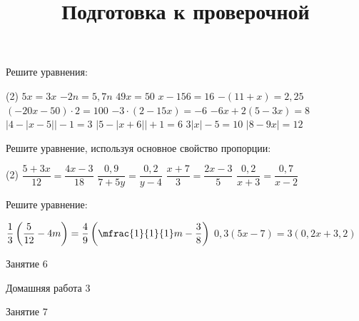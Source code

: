\begin{homework}[number=1]
	\begin{listofex}
		\item Решите уравнения: %
		\begin{tasks}(2)
			\task \( 5x=3x \)
			\task \( -2n=5,7n \)
			\task \( 49x=50 \)
			\task \( x-156=16 \)
			\task \( -(11+x)=2,25 \)
			\task \( (-20x-50)\cdot 2 = 100 \)
			\task \( -3 \cdot (2-15x) = -6 \)
			\task \( -6x+2(5-3x)=8 \)
			\task \( |4-|x-5||-1=3 \)
			\task \( |5-|x+6||+1=6 \)
			\task \( 3|x|-5=10 \)
			\task \( |8-9x|=12 \)
		\end{tasks}
		\item Решите уравнение, используя основное свойство пропорции:
		\begin{tasks}(2)
			\task \( \dfrac{5+3x}{12} = \dfrac{4x-3}{18} \)
			\task \( \dfrac{0,9}{7+5y} = \dfrac{0,2}{y-4} \)
			\task \( \dfrac{x+7}{3} = \dfrac{2x-3}{5} \)
			\task \( \dfrac{0,2}{x+3} = \dfrac{0,7}{x-2} \)
		\end{tasks}
		\item Решите уравнение: %
		\begin{tasks}
			\task \( \dfrac{1}{3} \left( \dfrac{5}{12}-4m \right) =\dfrac{4}{9} \left(  \mfrac{1}{1}{1} m-\dfrac{3}{8} \right) \)
			\task \( 0,3(5x-7)=3(0,2x+3,2) \)
		\end{tasks}
	\end{listofex}
\end{homework}

\begin{class}[number=6]
	\begin{listofex}
		\item Занятие 6
	\end{listofex}
\end{class}

\begin{homework}[number=3]
	\begin{listofex}
		\item Домашняя работа 3
	\end{listofex}
\end{homework}

\begin{class}[number=7]
	\title{Подготовка к проверочной}
	\begin{listofex}
		\item Занятие 7
	\end{listofex}
\end{class}

